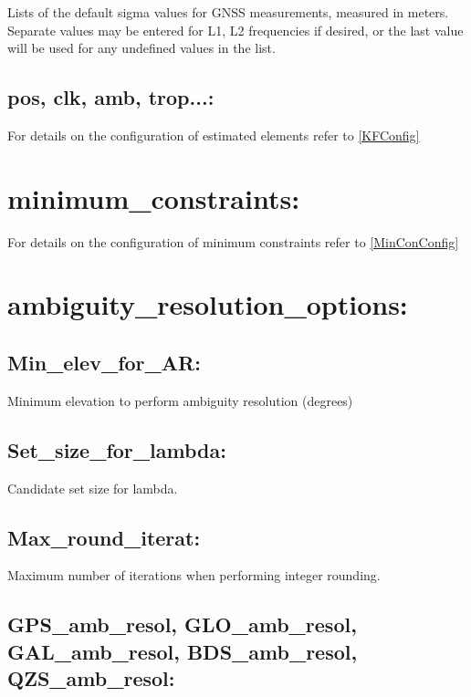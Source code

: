 Lists of the default sigma values for GNSS measurements, measured in meters.
Separate values may be entered for L1, L2 frequencies if desired, or the last value will be used for any undefined values in the list.

\subsection*{pos, clk, amb, trop...:}

For details on the configuration of estimated elements refer to \ref{KFConfig}

\section{minimum\_constraints:}

For details on the configuration of minimum constraints refer to \ref{MinConConfig}









\section{ambiguity\_resolution\_options:}

\subsection*{Min\_elev\_for\_AR:}

Minimum elevation to perform ambiguity resolution (degrees)


\subsection*{Set\_size\_for\_lambda:}

Candidate set size for lambda.


\subsection*{Max\_round\_iterat:}

Maximum number of iterations when performing integer rounding.


\subsection*{GPS\_amb\_resol, GLO\_amb\_resol, GAL\_amb\_resol, BDS\_amb\_resol, QZS\_amb\_resol:}

